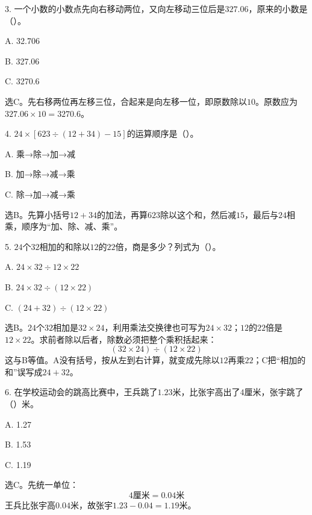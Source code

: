 3. 一个小数的小数点先向右移动两位，又向左移动三位后是\(327.06\)，原来的小数是（\hspace{1.8em}）。\par
\noindent A. 32.706\par
\noindent B. 327.06\par
\noindent C. 3270.6\par
\begin{BookAnswer}
选C。先右移两位再左移三位，合起来是向左移一位，即原数除以\(10\)。原数应为\(327.06\times10=3270.6\)。
\end{BookAnswer}

4. \(24\times[623\div(12+34)-15]\)的运算顺序是（\hspace{1.8em}）。\par
\noindent A. 乘→除→加→减\par
\noindent B. 加→除→减→乘\par
\noindent C. 除→加→减→乘\par
\begin{BookAnswer}
选B。先算小括号\(12+34\)的加法，再算\(623\)除以这个和，然后减\(15\)，最后与\(24\)相乘，顺序为“加、除、减、乘”。
\end{BookAnswer}

5. \(24\)个\(32\)相加的和除以\(12\)的\(22\)倍，商是多少？列式为（\hspace{1.8em}）。\par
\noindent A. \(24\times32\div12\times22\)\par
\noindent B. \(24\times32\div(12\times22)\)\par
\noindent C. \((24+32)\div(12\times22)\)\par
\begin{BookAnswer}
选B。\(24\)个\(32\)相加是\(32\times24\)，利用乘法交换律也可写为\(24\times32\)；\allowbreak{}\(12\)的\(22\)倍是\(12\times22\)。求前者除以后者，除数必须把整个乘积括起来：\[(32\times24)\div(12\times22)\]这与B等值。A没有括号，按从左到右计算，就变成先除以\(12\)再乘\(22\)；C把“相加的和”误写成\(24+32\)。
\end{BookAnswer}

6. 在学校运动会的跳高比赛中，王兵跳了\(1.23\)米，比张宇高出了\(4\)厘米，张宇跳了（\hspace{1.8em}）米。\par
\noindent A. 1.27\par
\noindent B. 1.53\par
\noindent C. 1.19\par
\begin{BookAnswer}
选C。先统一单位：\[4\text{厘米}=0.04\text{米}\]王兵比张宇高\(0.04\)米，故张宇\(1.23-0.04=1.19\)米。
\end{BookAnswer}

